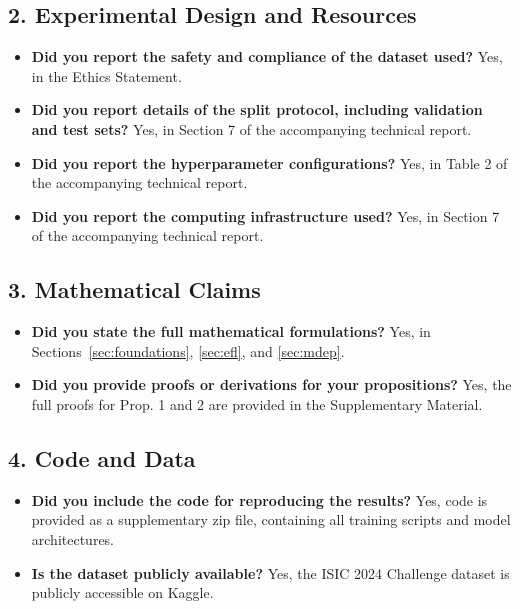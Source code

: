 \documentclass[11pt]{article}
\begin{document}
\subsection*{2. Experimental Design and Resources}
\begin{itemize}
    \item \textbf{Did you report the safety and compliance of the dataset used?} Yes, in the Ethics Statement.
    \item \textbf{Did you report details of the split protocol, including validation and test sets?} Yes, in Section 7 of the accompanying technical report.
    \item \textbf{Did you report the hyperparameter configurations?} Yes, in Table 2 of the accompanying technical report.
    \item \textbf{Did you report the computing infrastructure used?} Yes, in Section 7 of the accompanying technical report.
\end{itemize}

\subsection*{3. Mathematical Claims}
\begin{itemize}
    \item \textbf{Did you state the full mathematical formulations?} Yes, in Sections~\ref{sec:foundations}, \ref{sec:efl}, and \ref{sec:mdep}.
    \item \textbf{Did you provide proofs or derivations for your propositions?} Yes, the full proofs for Prop. 1 and 2 are provided in the Supplementary Material.
\end{itemize}

\subsection*{4. Code and Data}
\begin{itemize}
    \item \textbf{Did you include the code for reproducing the results?} Yes, code is provided as a supplementary zip file, containing all training scripts and model architectures.
    \item \textbf{Is the dataset publicly available?} Yes, the ISIC 2024 Challenge dataset is publicly accessible on Kaggle.
\end{itemize}
\end{document}
